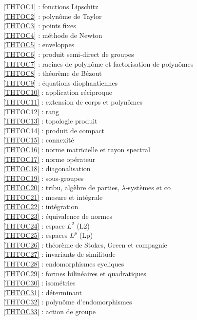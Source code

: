 \ref {THTOC1} : fonctions Lipschitz\\
\ref {THTOC2} : polynôme de Taylor\\
\ref {THTOC3} : points fixes\\
\ref {THTOC4} : méthode de Newton\\
\ref {THTOC5} : enveloppes\\
\ref {THTOC6} : produit semi-direct de groupes\\
\ref {THTOC7} : racines de polynôme et factorisation de polynômes\\
\ref {THTOC8} : théorème de Bézout\\
\ref {THTOC9} : équations diophantiennes\\
\ref {THTOC10} : application réciproque\\
\ref {THTOC11} : extension de corps et polynômes\\
\ref {THTOC12} : rang\\
\ref {THTOC13} : topologie produit\\
\ref {THTOC14} : produit de compact\\
\ref {THTOC15} : connexité\\
\ref {THTOC16} : norme matricielle et rayon spectral\\
\ref {THTOC17} : norme opérateur\\
\ref {THTOC18} : diagonalisation\\
\ref {THTOC19} : sous-groupes\\
\ref {THTOC20} : tribu, algèbre de parties, \( \lambda \)-systèmes et co\\
\ref {THTOC21} : mesure et intégrale\\
\ref {THTOC22} : intégration\\
\ref {THTOC23} : équivalence de normes\\
\ref {THTOC24} : espace \( L^2\) (L2)\\
\ref {THTOC25} : espaces \( L^p\) (Lp)\\
\ref {THTOC26} : théorème de Stokes, Green et compagnie\\
\ref {THTOC27} : invariants de similitude\\
\ref {THTOC28} : endomorphismes cycliques\\
\ref {THTOC29} : formes bilinéaires et quadratiques\\
\ref {THTOC30} : isométries\\
\ref {THTOC31} : déterminant\\
\ref {THTOC32} : polynôme d'endomorphismes\\
\ref {THTOC33} : action de groupe\\
